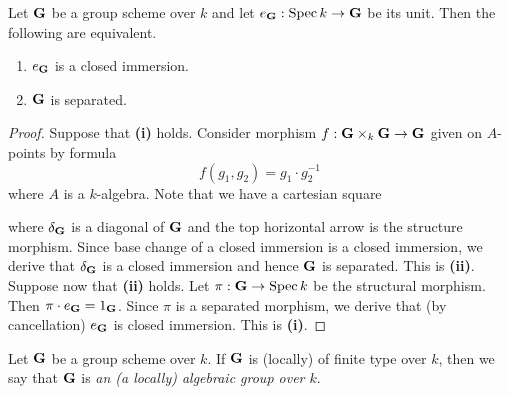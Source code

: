\begin{proposition}\label{proposition:separatedness_criterion}
Let $\mathbf{G}$ be a group scheme over $k$ and let $e_{\mathbf{G}}:\mathrm{Spec}\, k\rightarrow \mathbf{G}$ be its unit. Then the following are equivalent.
\begin{enumerate}[label=\emph{\textbf{(\roman*)}}, leftmargin=3.0em]
\item $e_{\mathbf{G}}$ is a closed immersion.
\item $\mathbf{G}$ is separated.
\end{enumerate}
\end{proposition}
\begin{proof}
Suppose that \textbf{(i)} holds. Consider morphism $f:\mathbf{G}\times_k\mathbf{G}\rightarrow \mathbf{G}$ given on $A$-points by formula
$$f(g_1,g_2) = g_1\cdot g_2^{-1}$$
where $A$ is a $k$-algebra. Note that we have a cartesian square
\begin{center}
\end{center}
where $\delta_{\mathbf{G}}$ is a diagonal of $\mathbf{G}$ and the top horizontal arrow is the structure morphism. Since base change of a closed immersion is a closed immersion, we derive that $\delta_{\mathbf{G}}$ is a closed immersion and hence $\mathbf{G}$ is separated. This is \textbf{(ii)}.\\
Suppose now that \textbf{(ii)} holds. Let $\pi:\mathbf{G}\rightarrow \mathrm{Spec}\, k$ be the structural morphism. Then $\pi\cdot e_{\mathbf{G}} = 1_{\mathbf{G}}$. Since $\pi$ is a separated morphism, we derive that (by cancellation) $e_{\mathbf{G}}$ is closed immersion. This is \textbf{(i)}.
\end{proof}

\begin{definition}
Let $\mathbf{G}$ be a group scheme over $k$. If $\mathbf{G}$ is (locally) of finite type over $k$, then we say that $\mathbf{G}$ is \textit{an (a locally) algebraic group over $k$}.
\end{definition}

